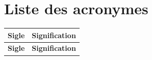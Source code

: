 \sautLiminaire
{}
{}
\chapter*{Liste des acronymes}

\begin{longtable}{@{}p{2.6cm}p{11.5cm}@{}}
\toprule
\textbf{Sigle} & \textbf{Signification} \\ \midrule
\endfirsthead
\toprule
\textbf{Sigle} & \textbf{Signification} \\ \midrule
\endhead


\end{longtable}
